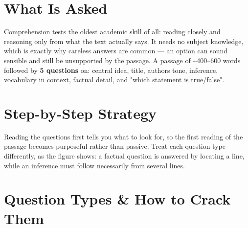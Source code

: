 

\needspace{191pt}

\hypertarget{p1-03--what-is-asked}{%
\section{What Is Asked}\label{p1-03--what-is-asked}}

Comprehension tests the oldest academic skill of all: reading closely and reasoning only from what the text
actually says. It needs no subject knowledge, which is exactly why careless answers are common --- an option
can sound sensible and still be unsupported by the passage.
A passage of \textasciitilde400--600 words followed by \textbf{5 questions} on: central idea, title, author\textquotesingle s tone, inference,
vocabulary in context, factual detail, and "which statement is true/false".

\needspace{125pt}

\hypertarget{p1-03--step-by-step-strategy}{%
\section{Step-by-Step Strategy}\label{p1-03--step-by-step-strategy}}

Reading the questions first tells you what to look for, so the first reading of the passage becomes
purposeful rather than passive. Treat each question type differently, as the figure shows: a factual
question is answered by locating a line, while an inference must follow necessarily from several lines.



\needspace{130pt}

\hypertarget{p1-03--question-types--how-to-crack-them}{%
\section{Question Types \& How to Crack Them}\label{p1-03--question-types--how-to-crack-them}}

\begingroup\small

